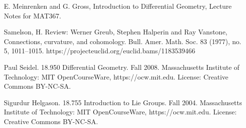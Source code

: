 \documentclass{article}
\theoremstyle{definition}
\begin{document}



\newpage
\begin{thebibliography}{}

\bibitem[]{}
E. Meinrenken and G. Gross, Introduction to Differential Geometry, Lecture Notes for MAT367. 

\bibitem[]{}
Samelson, H. Review: Werner Greub, Stephen Halperin and Ray Vanstone, Connections, curvature, and cohomology. Bull. Amer. Math. Soc. 83 (1977), no. 5, 1011--1015. https://projecteuclid.org/euclid.bams/1183539466

\bibitem[]{}
Paul Seidel. 18.950 Differential Geometry. Fall 2008. Massachusetts Institute of Technology: MIT OpenCourseWare, https://ocw.mit.edu. License: Creative Commons BY-NC-SA.

\bibitem[]{}
Sigurdur Helgason. 18.755 Introduction to Lie Groups. Fall 2004. Massachusetts Institute of Technology: MIT OpenCourseWare, https://ocw.mit.edu. License: Creative Commons BY-NC-SA.


\end{thebibliography}
\end{document}
